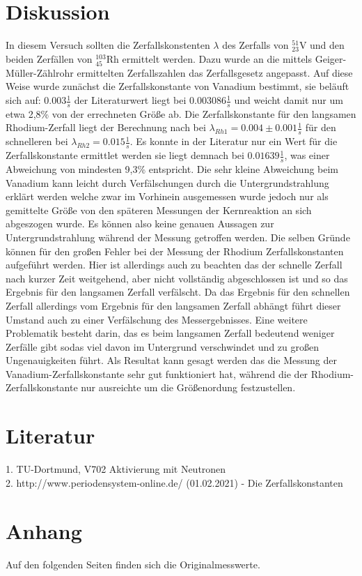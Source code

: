 \section{Diskussion}
\label{sec:diskussion}
In diesem Versuch sollten die Zerfallskonstenten $\lambda$ des Zerfalls von $^{51}_{23}\mathrm{V}$ und den 
beiden Zerfällen von $^{103}_{45}\mathrm{Rh}$ ermittelt werden. Dazu wurde an die mittels Geiger-Müller-Zählrohr
ermittelten Zerfallszahlen das Zerfallsgesetz angepasst. Auf diese Weise wurde zunächst die Zerfallskonstante
von Vanadium bestimmt, sie beläuft sich auf: $0.003\frac{1}{s}$ der Literaturwert liegt bei $0.003086\frac{1}{s}$
und weicht damit nur um etwa 2,8\% von der errechneten Größe ab. Die Zerfallskonstante für den langsamen Rhodium-Zerfall
liegt der Berechnung nach bei $\lambda_{Rh1} =0.004\pm 0.001\frac{1}{s}$ für den schnelleren bei $\lambda_{Rh2} =0.015\frac{1}{s}$.
Es konnte in der Literatur nur ein Wert für die Zerfallskonstante ermittlet werden sie liegt demnach bei 
$0.01639\frac{1}{s}$, was einer Abweichung von mindesten 9,3\% entspricht. Die sehr kleine Abweichung beim Vanadium
kann leicht durch Verfälschungen durch die Untergrundstrahlung erklärt werden welche zwar im Vorhinein 
ausgemessen wurde jedoch nur als gemittelte Größe von den späteren Messungen der Kernreaktion an sich abgeszogen wurde.
Es können also keine genauen Aussagen zur Untergrundstrahlung während der Messung getroffen werden.
Die selben Gründe können für den großen Fehler bei der Messung der Rhodium Zerfallskonstanten aufgeführt werden.
Hier ist allerdings auch zu beachten das der schnelle Zerfall nach kurzer Zeit weitgehend, aber nicht vollständig 
abgeschlossen ist und so das Ergebnis für den langsamen Zerfall verfälscht. Da das Ergebnis für den schnellen Zerfall
allerdings vom Ergebnis für den langsamen Zerfall abhängt führt dieser Umstand auch zu einer Verfälschung 
des Messergebnisses. Eine weitere Problematik besteht darin, das es beim langsamen Zerfall bedeutend weniger 
Zerfälle gibt sodas viel davon im Untergrund verschwindet und zu großen Ungenauigkeiten führt. Als Resultat kann
gesagt werden das die Messung der Vanadium-Zerfallskonstante sehr gut funktioniert hat, während die der 
Rhodium-Zerfallskonstante nur ausreichte um die Größenordung festzustellen. 



\section{Literatur}
\label{sec:literatur}
1. TU-Dortmund, V702 Aktivierung mit Neutronen\\
2. http://www.periodensystem-online.de/ (01.02.2021) - Die Zerfallskonstanten

\section{Anhang}
\label{sec:anhang}
Auf den folgenden Seiten finden sich die Originalmesswerte.